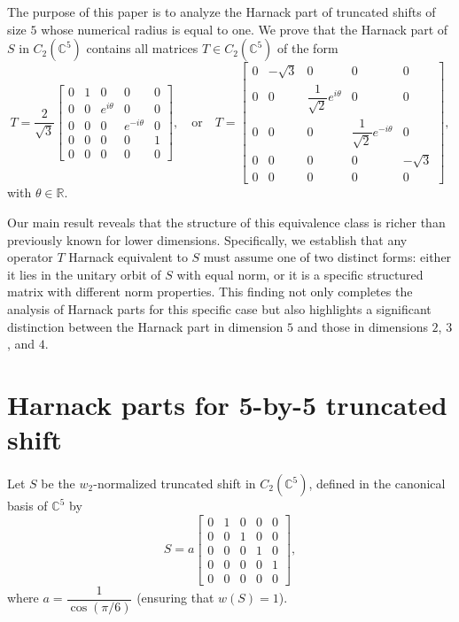 \documentclass[12pt, reqno]{amsart}
\theoremstyle{definition}
\theoremstyle{remark}
\numberwithin{equation}{section}
\begin{document}
The purpose of this paper is to analyze the Harnack part of truncated shifts of size $5$ whose numerical radius is equal to one. We prove that the Harnack part of $S$ in $C_2(\mathbb{C}^{5})$ contains all matrices $T \in C_2(\mathbb{C}^5)$ of the form
\begin{equation}\label{T case123}
	T = \dfrac{2}{\sqrt{3}} \begin{bmatrix}
		0 & 1 & 0 & 0 & 0 \\
		0 & 0 & e^{i\theta} & 0 & 0 \\
		0 & 0 & 0 & e^{-i\theta} & 0 \\
		0 & 0 & 0 & 0 & 1 \\
		0 & 0 & 0 & 0 & 0
	\end{bmatrix},\quad \text{or} \quad 
	T = \begin{bmatrix}
		0 & -\sqrt{3} & 0 & 0 & 0 \\
		0 & 0 & \dfrac{1}{\sqrt{2}}e^{i\theta} & 0 & 0 \\
		0 & 0 & 0 & \dfrac{1}{\sqrt{2}}e^{-i\theta} & 0 \\
		0 & 0 & 0 & 0 & -\sqrt{3} \\
		0 & 0 & 0 & 0 & 0
	\end{bmatrix},
\end{equation} 
with $\theta \in \mathbb{R}$. 

Our main result reveals that the structure of this equivalence class is richer than previously known for lower dimensions. Specifically, we establish that any operator $T$ Harnack equivalent to $S$ must assume one of two distinct forms: either it lies in the unitary orbit of $S$ with equal norm, or it is a specific structured matrix with different norm properties. This finding not only completes the analysis of Harnack parts for this specific case but also highlights a significant distinction between the Harnack part in dimension $5$ and those in dimensions $2$, $3$, and $4$.
\section{Harnack parts for 5-by-5 truncated shift}

Let $S$ be the $w_2$-normalized truncated shift in $C_{2}(\mathbb{C}^{5})$, defined in the canonical basis of $\mathbb{C}^5$ by
\begin{equation}\label{truncated shift}
	S = a\begin{bmatrix}
		0 & 1 & 0 & 0 & 0 \\
		0 & 0 & 1 & 0 & 0 \\
		0 & 0 & 0 & 1 & 0 \\
		0 & 0 & 0 & 0 & 1 \\
		0 & 0 & 0 & 0 & 0
	\end{bmatrix},
\end{equation} 
where $a = \dfrac{1}{\cos(\pi/6)}$ (ensuring that $w(S)=1$).
\end{document}
